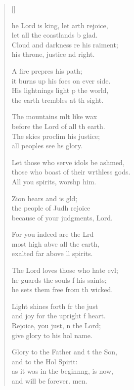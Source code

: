 \settowidth{\versewidth}{Let those who serve idols be ashamed,   +}
\begin{verse}[\versewidth]
  \begin{patverse}
    he Lord is king, let arth rejoice,\Med\\
let all the coastlands b glad.\\
Cloud and darkness re his raiment;\Med\\
his throne, justice nd right.

A fire prepres his path;\Med\\
it burns up his foes on ever side.\\
His lightnings light p the world,\Med\\
the earth trembles at th sight.

The mountains mlt like wax\Med\\
before the Lord of all th earth.\\
The skies proclim his justice;\Med\\
all peoples see h\pointup{\i}s glory.

Let those who serve idols be ashmed,\Flex\\
those who boast of their wrthless gods.\Med\\
All you spirits, worsh\pointup{\i}p him.

Zion hears and is gld;\Flex\\
the people of Judh rejoice\Med\\
because of your judgments,  Lord.

For you indeed are the Lrd\Flex\\
most high abve all the earth,\Med\\
exalted far above ll spirits.

The Lord loves those who hate ev\pointup{\i}l;\Flex\\
he guards the souls f his saints;\Med\\
he sets them free from th wicked.

Light shines forth fr the just\Med\\
and joy for the upright f heart.\\
Rejoice, you just, \pointup{\i}n the Lord;\Med\\
give glory to his hol name.

Glory to the Father and t the Son,\Med\\
and to the Hol Spirit:\\
as it was in the beginn\pointup{\i}ng, is now,\Med\\
and will be forever. men.
  \end{patverse}
\end{verse}
